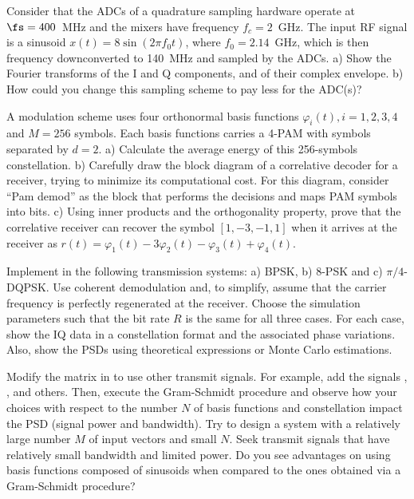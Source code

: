 \begin{exercises}
\item Consider that the ADCs of a quadrature sampling hardware operate at $\fs=400$~MHz and the mixers have frequency $f_c = 2$~GHz. The input RF signal is a sinusoid $x(t)=8 \sin(2 \pi f_0 t)$, where $f_0=2.14$~GHz, which is then frequency downconverted to 140~MHz and sampled by the ADCs. a) Show the Fourier transforms of the I and Q components, and of their complex envelope. b) How could you change this sampling scheme to pay less for the ADC(s)?

\item A modulation scheme uses four orthonormal basis functions $\varphi_i(t), i=1,2,3,4$ and $M=256$ symbols. Each basis functions carries a 4-PAM with symbols separated by $d=2$. a) Calculate the average energy of this 256-symbols constellation. b) Carefully draw the block diagram of a correlative decoder for a receiver, trying to minimize its computational cost. For this diagram, consider ``Pam demod'' as the block that performs the decisions and maps PAM symbols into bits. c) Using inner products and the orthogonality property, prove that the correlative receiver can recover the symbol $[1,-3,-1,1]$ when it arrives at the receiver as $r(t) = \varphi_1(t) - 3 \varphi_2(t) - \varphi_3(t) + \varphi_4(t)$.

\item Implement in {\matlab} the following transmission systems: a) BPSK, b) 8-PSK and c) $\pi/4$-DQPSK. Use coherent demodulation and, to simplify, assume that the carrier frequency is perfectly regenerated at the receiver. Choose the simulation parameters such that the bit rate $R$ is the same for all three cases. For each case, show the IQ data in a constellation format and the associated phase variations. Also, show the PSDs using theoretical expressions or Monte Carlo estimations.


\item Modify the matrix  in  to use other transmit signals. For example, add the signals , ,  and others. Then, execute the Gram-Schmidt procedure and observe how your choices with respect to the number $N$ of basis functions and constellation impact the PSD (signal power and bandwidth). Try to design a system with a relatively large number $M$ of input vectors and small $N$. Seek transmit signals that have relatively small bandwidth and limited power. Do you see advantages on using basis functions
composed of sinusoids when compared to the ones obtained via a Gram-Schmidt procedure?


\end{exercises}
